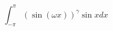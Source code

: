 \documentclass[11pt,a4paper]{article}
\begin{document}
    \begin{equation}\label{1}
      \int_{-\pi }^{\pi } (\sin{(\omega x)})^{\gamma} \sin x dx
    \end{equation}
\end{document}
